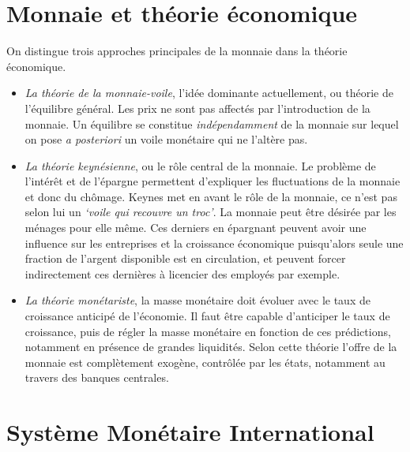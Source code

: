 \documentclass[main.tex]{subfiles}
\begin{document}
        \section{Monnaie et théorie économique}

        On distingue trois approches principales de la monnaie dans la théorie économique.
        \begin{itemize}
                \item \emph{La théorie de la monnaie-voile}, l'idée dominante actuellement, ou théorie de l'équilibre général. Les prix ne sont pas affectés par l'introduction de la monnaie. Un équilibre se constitue \emph{indépendamment} de la monnaie sur lequel on pose \textit{a posteriori} un voile monétaire qui ne l'altère pas.

                \item \emph{La théorie keynésienne}, ou le rôle central de la monnaie. Le problème de l'intérêt et de l'épargne permettent d'expliquer les fluctuations de la monnaie et donc du chômage. Keynes met en avant le rôle de la monnaie, ce n'est pas selon lui un \emph{`voile qui recouvre un troc'}. La monnaie peut être désirée par les ménages pour elle même. Ces derniers en épargnant peuvent avoir une influence sur les entreprises et la croissance économique puisqu'alors seule une fraction de l'argent disponible est en circulation, et peuvent forcer indirectement ces dernières à licencier des employés par exemple.

                \item \emph{La théorie monétariste}, la masse monétaire doit évoluer avec le taux de croissance anticipé de l'économie. Il faut être capable d'anticiper le taux de croissance, puis de régler la masse monétaire en fonction de ces prédictions, notamment en présence de grandes liquidités. Selon cette théorie l'offre de la monnaie est complètement exogène, contrôlée par les états, notamment au travers des banques centrales.
        \end{itemize}

        \section{Système Monétaire International}

        \startchronology[startyear=1800,stopyear=2020, color=gray,height=7ex,width=\hsize, arrow=false]
        \endchronology
\end{document}

